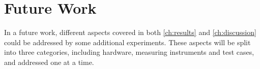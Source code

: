\chapter{Future Work}\label{ch:future_work}

In a future work, different aspects covered in both \cref{ch:results} and \cref{ch:discussion} could be addressed by some additional experiments. These aspects will be split into three categories, including hardware, measuring instruments and test cases, and addressed one at a time.






